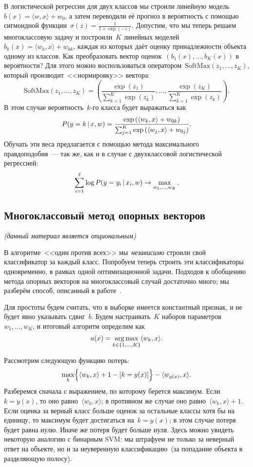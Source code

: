 \documentclass[12pt,fleqn]{article}
\begin{document}
В логистической регрессии для двух классов мы строили линейную модель~$b(x) = \langle w, x \rangle + w_0$,
а затем переводили её прогноз в вероятность с помощью сигмоидной функции~$\sigma(z) = \frac{1}{1 + \exp(-z)}$.
Допустим, что мы теперь решаем многоклассовую задачу и построили~$K$ линейных моделей~$b_k(x) = \langle w_k, x \rangle + w_{0k}$,
каждая из которых даёт оценку принадлежности объекта одному из классов.
Как преобразовать вектор оценок~$(b_1(x), \dots, b_K(x))$ в вероятности?
Для этого можно воспользоваться оператором~$\text{SoftMax}(z_1, \dots, z_K)$,
который производит~<<нормировку>> вектора:
\[
    \text{SoftMax}(z_1, \dots, z_K)
    =
    \left(
        \frac{\exp(z_1)}{\sum_{k = 1}^{K} \exp(z_k)},
        \dots,
        \frac{\exp(z_K)}{\sum_{k = 1}^{K} \exp(z_k)}
    \right).
\]
В этом случае вероятность~$k$-го класса будет выражаться как
\[
    P(y = k \mspace{3mu}{|}\mspace{3mu} x, w)
    =
    \frac{
        \exp{(\langle w_k, x \rangle + w_{0k})}
    }{
        \sum_{j = 1}^{K}
            \exp{(\langle w_j, x \rangle + w_{0j})}
    }.
\]
Обучать эти веса предлагается с помощью метода максимального правдоподобия~--- так же,
как и в случае с двухклассовой логистической регрессией:
\[
    \sum_{i = 1}^{\ell}
        \log P(y = y_i \mspace{3mu}{|}\mspace{3mu} x_i, w)
    \to
    \max_{w_1, \dots, w_K}.
\]

\subsection{Многоклассовый метод опорных векторов}

\emph{(данный материал является опциональным)}

В алгоритме~<<один против всех>> мы~\emph{независимо} строили свой классификатор
за каждый класс.
Попробуем теперь строить эти классификаторы одновременно,
в рамках одной оптимизационной задачи.
Подходов к обобщению метода опорных векторов на многоклассовый случай достаточно много;
мы разберём способ, описанный в работе~\cite{crammer01multiclass}.

Для простоты будем считать, что в выборке имеется константный признак,
и не будет явно указывать сдвиг~$b$.
Будем настраивать~$K$ наборов параметров~$w_1, \dots, w_K$,
и итоговый алгоритм определим как
\[
    a(x) = \mathop{\rm arg\,max}\limits_{k \in \{1, \dots, K\}}
        \langle w_k, x \rangle.
\]

Рассмотрим следующую функцию потерь:
\begin{equation}
\label{eq:multSvmLoss}
    \max_k \Bigl\{
        \langle w_k, x \rangle
        + 1 - [k = y(x)]
    \Bigr\}
    - \langle w_{y(x)}, x \rangle.
\end{equation}
Разберемся сначала с выражением, по которому берется максимум.
Если~$k = y(x)$, то оно равно~$\langle w_k, x \rangle$;
в противном же случае оно равно~$\langle w_k, x \rangle + 1$.
Если оценка за верный класс больше оценок за остальные классы хотя бы на единицу,
то максимум будет достигаться на~$k = y(x)$; в этом случае
потеря будет равна нулю.
Иначе же потеря будет больше нуля.
Здесь можно увидеть некоторую аналогию с бинарным SVM:
мы штрафуем не только за неверный ответ на объекте,
но и за неуверенную классификацию~(за попадание объекта в разделяющую полосу).
\end{document}
